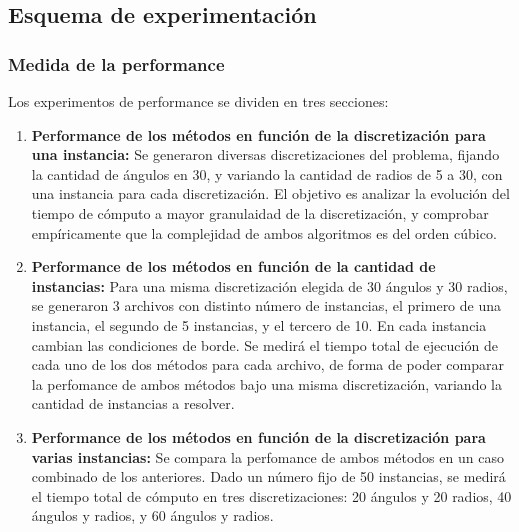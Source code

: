 \subsection{Esquema de experimentación}
\subsubsection{Medida de la performance}

Los experimentos de performance se dividen en tres secciones:

\begin{enumerate}

\item \textbf {Performance de los m\'etodos en funci\'on de la discretizaci\'on para una instancia:}  Se generaron diversas discretizaciones del problema, fijando la cantidad de \'angulos en 30, y variando la cantidad de radios de 5 a 30, con una instancia para cada discretizaci\'on. El objetivo es analizar la evoluci\'on del tiempo de c\'omputo a mayor granulaidad de la discretizaci\'on, y comprobar emp\'iricamente que la complejidad de ambos algoritmos es del orden c\'ubico.
\item \textbf {Performance de los m\'etodos en funci\'on de la cantidad de instancias:} Para una misma discretizaci\'on elegida de 30 \'angulos y 30 radios, se generaron 3 archivos con distinto n\'umero de instancias, el primero de una instancia, el segundo de 5 instancias, y el tercero de 10. En cada instancia cambian las condiciones de borde. Se medir\'a el tiempo total de ejecuci\'on de cada uno de los dos m\'etodos para cada archivo, de forma de poder comparar la perfomance de ambos m\'etodos bajo una misma discretizaci\'on, variando la cantidad de instancias a resolver.
\item \textbf {Performance de los m\'etodos en funci\'on de la discretizaci\'on para varias instancias:}
Se compara la perfomance de ambos m\'etodos en un caso combinado de los anteriores. Dado un n\'umero fijo de 50 instancias, se medir\'a el tiempo total de c\'omputo en tres discretizaciones: 20 \'angulos y 20 radios, 40 \'angulos y radios, y 60 \'angulos y radios. 
\end{enumerate}

